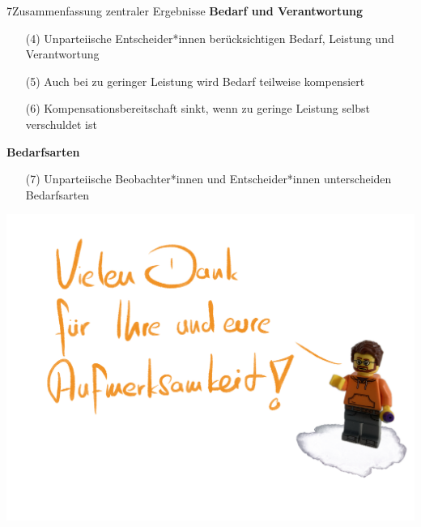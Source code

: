 \documentclass[xcolor=table,9pt,aspectratio=169]{beamer}
\begin{document}
\begin{frame}{\vspace*{10mm}7\hspace*{1em}Zusammenfassung zentraler Ergebnisse}
\textbf{Bedarf und Verantwortung}\\
\medskip
\begin{itemize}
   \item[(4)] Unparteiische Entscheider*innen berücksichtigen Bedarf, Leistung und Verantwortung
   \item[(5)] Auch bei zu geringer Leistung wird Bedarf teilweise kompensiert
   \item[(6)] Kompensationsbereitschaft sinkt, wenn zu geringe Leistung selbst verschuldet ist
\end{itemize}
\vspace{2em}
\textbf{Bedarfsarten}\\
\medskip
\begin{itemize}
   \item[(7)] Unparteiische Beobachter*innen und Entscheider*innen unterscheiden Bedarfsarten
   \end{itemize}
\end{frame}


\begin{frame}{}
\begin{center}
   \includegraphics[width=0.8\linewidth]{figures/slides_thanks.pdf}
\end{center}
\end{frame}
\end{document}

